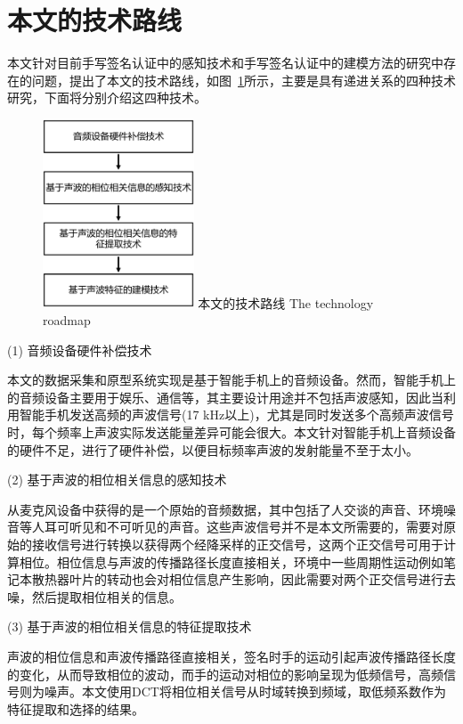 \section{本文的技术路线}

本文针对目前手写签名认证中的感知技术和手写签名认证中的建模方法的研究中存在的问题，提出了本文的技术路线，如图~\ref{fig:technology-roadmap}所示，主要是具有递进关系的四种技术研究，下面将分别介绍这四种技术。
\begin{figure}[!htp]
  \centering
  \includegraphics[width=0.4\textwidth]{figure/technique-road.pdf}
  \bicaption
    {本文的技术路线}
    {The technology roadmap}
  \label{fig:technology-roadmap}
\end{figure}

(1) 音频设备硬件补偿技术

本文的数据采集和原型系统实现是基于智能手机上的音频设备。然而，智能手机上的音频设备主要用于娱乐、通信等，其主要设计用途并不包括声波感知，因此当利用智能手机发送高频的声波信号(17 kHz以上)，尤其是同时发送多个高频声波信号时，每个频率上声波实际发送能量差异可能会很大。本文针对智能手机上音频设备的硬件不足，进行了硬件补偿，以便目标频率声波的发射能量不至于太小。

(2) 基于声波的相位相关信息的感知技术

从麦克风设备中获得的是一个原始的音频数据，其中包括了人交谈的声音、环境噪音等人耳可听见和不可听见的声音。这些声波信号并不是本文所需要的，需要对原始的接收信号进行转换以获得两个经降采样的正交信号，这两个正交信号可用于计算相位。相位信息与声波的传播路径长度直接相关，环境中一些周期性运动例如笔记本散热器叶片的转动也会对相位信息产生影响，因此需要对两个正交信号进行去噪，然后提取相位相关的信息。

(3) 基于声波的相位相关信息的特征提取技术

声波的相位信息和声波传播路径直接相关，签名时手的运动引起声波传播路径长度的变化，从而导致相位的波动，而手的运动对相位的影响呈现为低频信号，高频信号则为噪声。本文使用DCT将相位相关信号从时域转换到频域，取低频系数作为特征提取和选择的结果。


